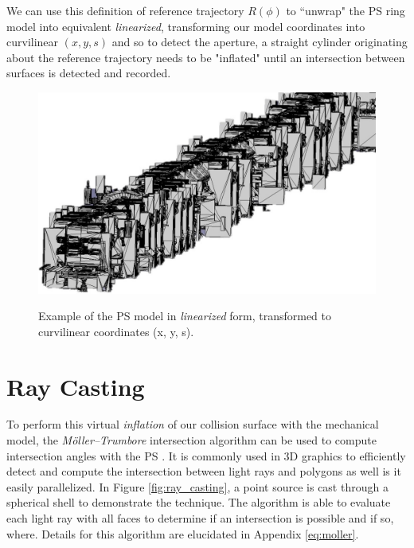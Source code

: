 We can use this definition of reference trajectory $R(\phi)$ to ``unwrap" the PS ring model into equivalent \textit{linearized}, transforming our model coordinates into curvilinear $(x, y, s)$ and so to detect the aperture, a straight cylinder originating about the reference trajectory needs to be "inflated" until an intersection between surfaces is detected and recorded.
\begin{figure}
    \centering
    \includegraphics{figs/ps_linac.png}
    \label{fig:ps_linac}
    \caption{Example of the PS model in \textit{linearized} form, transformed to curvilinear coordinates (x, y, s).}
\end{figure}

\section{Ray Casting}

To perform this virtual \textit{inflation} of our collision surface with the mechanical model, the \textit{Möller–Trumbore} intersection algorithm can be used to compute intersection angles with the PS \cite{moller_fast_1997}. It is commonly used in 3D graphics to efficiently detect and compute the intersection between light rays and polygons as well is it easily parallelized. In Figure  \ref{fig:ray_casting}, a point source is cast through a spherical shell to demonstrate the technique. The algorithm is able to evaluate each light ray with all faces to determine if an intersection is possible and if so, where. Details for this algorithm are elucidated in Appendix \ref{eq:moller}.

